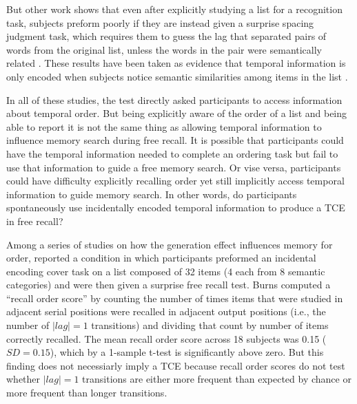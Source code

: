 \documentclass[man,natbib,floatsintext]{apa6} %
\begin{document}
But other work shows that even after explicitly studying a list for a recognition task, subjects preform poorly if they are instead given a surprise spacing judgment task, which requires them to guess the lag that separated pairs of words from the original list, unless the words in the pair were semantically related \citep{HintEtal75,HintBloc73}. These results have been taken as evidence that temporal information is only encoded when subjects notice semantic similarities among items in the list \citep[i.e., study phase retreival]{HintEtal75,HintBloc73,Hint16}.

In all of these studies, the test directly asked participants to access information about temporal order. But being explicitly aware of the order of a list and being able to report it is not the same thing as allowing temporal information to influence memory search during free recall. It is possible that participants could have the temporal information needed to complete an ordering task but fail to use that information to guide a free memory search. Or vise versa, participants could have difficulty explicitly recalling order yet still implicitly access temporal information to guide memory search. In other words, do participants spontaneously use incidentally encoded temporal information to produce a TCE in free recall? 

Among a series of studies on how the generation effect influences memory for order, \citet{Burn96} reported a condition in which participants preformed an incidental encoding cover task on a list composed of 32 items (4 each from 8 semantic categories) and were then given a surprise free recall test. Burns computed a ``recall order score'' by counting the number of times items that were studied in adjacent serial positions were recalled in adjacent output positions (i.e., the number of $|lag|=1$ transitions) and dividing that count by number of items correctly recalled.  The mean recall order score across 18 subjects was 0.15 ($SD = 0.15$), which by a 1-sample t-test is significantly above zero. But this finding does not necessiarly imply a TCE because recall order scores do not test whether $|lag|=1$ transitions are either more frequent than expected by chance or more frequent than longer transitions.
\end{document}
